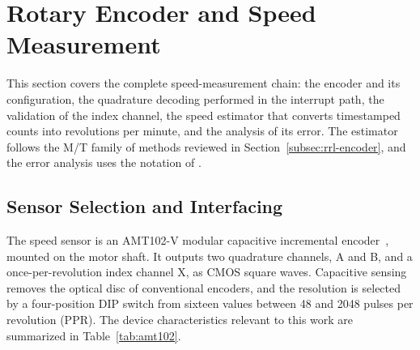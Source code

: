 \section{Rotary Encoder and Speed Measurement}
\label{sec:agit-speed}

This section covers the complete speed-measurement chain: the encoder and its configuration, the quadrature decoding performed in the interrupt path, the validation of the index channel, the speed estimator that converts timestamped counts into revolutions per minute, and the analysis of its error. The estimator follows the M/T family of methods reviewed in Section~\ref{subsec:rrl-encoder}, and the error analysis uses the notation of \citet{anuchin2019}.

\subsection{Sensor Selection and Interfacing}
\label{subsec:agit-encoder-sel}

The speed sensor is an AMT102-V modular capacitive incremental encoder~\citep{sameskyamt10}, mounted on the motor shaft. It outputs two quadrature channels, A and B, and a once-per-revolution index channel X, as CMOS square waves. Capacitive sensing removes the optical disc of conventional encoders, and the resolution is selected by a four-position DIP switch from sixteen values between 48 and 2048 pulses per revolution (PPR). The device characteristics relevant to this work are summarized in Table~\ref{tab:amt102}.


